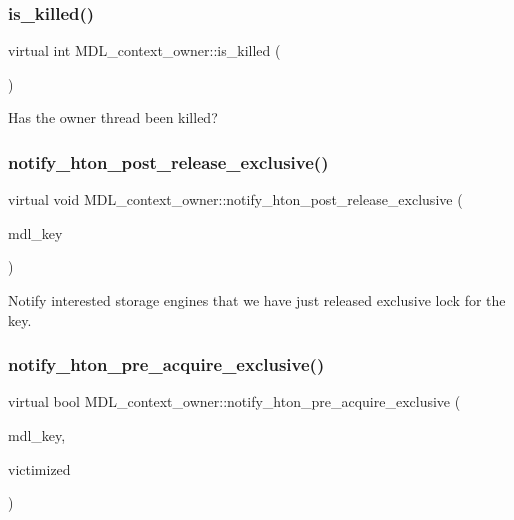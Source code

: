 \subsubsection{\texorpdfstring{is\+\_\+killed()}{is\_killed()}}
{\footnotesize\ttfamily virtual int M\+D\+L\+\_\+context\+\_\+owner\+::is\+\_\+killed (\begin{DoxyParamCaption}{ }\end{DoxyParamCaption})\hspace{0.3cm}{\ttfamily [pure virtual]}}

Has the owner thread been killed? \mbox{\label{classMDL__context__owner_a7e81e421fe965e530fd0c63d2f6c7dbd}} 
\subsubsection{\texorpdfstring{notify\+\_\+hton\+\_\+post\+\_\+release\+\_\+exclusive()}{notify\_hton\_post\_release\_exclusive()}}
{\footnotesize\ttfamily virtual void M\+D\+L\+\_\+context\+\_\+owner\+::notify\+\_\+hton\+\_\+post\+\_\+release\+\_\+exclusive (\begin{DoxyParamCaption}\item[{const \mbox{\hyperlink{structMDL__key}{M\+D\+L\+\_\+key}} $\ast$}]{mdl\+\_\+key }\end{DoxyParamCaption})\hspace{0.3cm}{\ttfamily [pure virtual]}}

Notify interested storage engines that we have just released exclusive lock for the key. \mbox{\label{classMDL__context__owner_a3f8c368fe7da7c6d8d0162f3617005be}} 
\subsubsection{\texorpdfstring{notify\+\_\+hton\+\_\+pre\+\_\+acquire\+\_\+exclusive()}{notify\_hton\_pre\_acquire\_exclusive()}}
{\footnotesize\ttfamily virtual bool M\+D\+L\+\_\+context\+\_\+owner\+::notify\+\_\+hton\+\_\+pre\+\_\+acquire\+\_\+exclusive (\begin{DoxyParamCaption}\item[{const \mbox{\hyperlink{structMDL__key}{M\+D\+L\+\_\+key}} $\ast$}]{mdl\+\_\+key,  }\item[{bool $\ast$}]{victimized }\end{DoxyParamCaption})\hspace{0.3cm}{\ttfamily [pure virtual]}}

